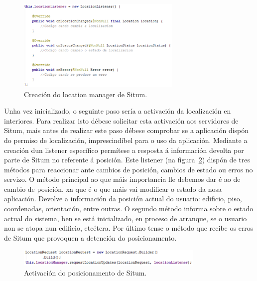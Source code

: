 \begin{figure}[htb] 
	\begin{center}
		\includegraphics[width=0.7\textwidth]{figures/codigo/situmLocationManager}
		\caption{Creación do location manager de Situm.}
		\label{fig:situmLocationManager}
	\end{center}
\end{figure}

Unha vez inicializado, o seguinte paso sería a activación da localización en interiores. Para realizar isto débese solicitar esta activación aos servidores de Situm, mais antes de realizar este paso débese comprobar se a aplicación dispón do permiso de localización, imprescindíbel para o uso da aplicación. Mediante a creación dun listener específico permítese a resposta á información devolta por parte de Situm no referente á posición. Este listener (na figura~\ref{fig:situmPosicionamento}) dispón de tres métodos para reaccionar ante cambios de posición, cambios de estado ou erros no servizo. O método principal ao que máis importancia lle debemos dar é ao de cambio de posición, xa que é o que máis vai modificar o estado da nosa aplicación. Devolve a información da posición actual do usuario: edificio, piso, coordenadas, orientación, entre outras. O segundo método informa sobre o estado actual do sistema, ben se está inicializado, en proceso de arranque, se o usuario non se atopa nun edificio, etcétera. Por último tense o método que recibe os erros de Situm que provoquen a detención do posicionamento.

\begin{figure}[htb] 
	\begin{center}
		\includegraphics[width=0.8\textwidth]{figures/codigo/situmPosicionamento}
		\caption{Activación do posicionamento de Situm.}
		\label{fig:situmPosicionamento}
	\end{center}
\end{figure}

